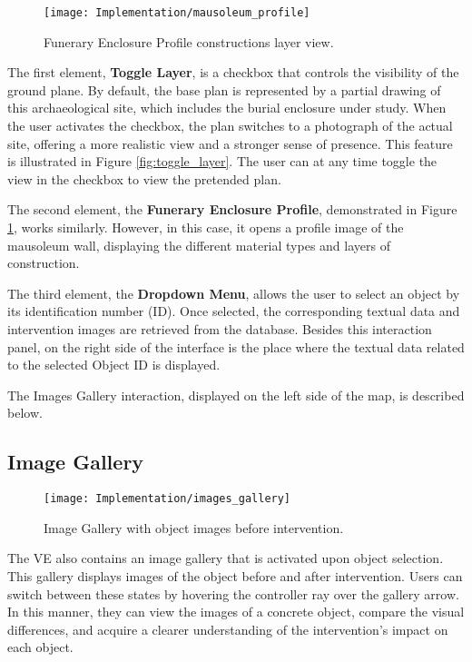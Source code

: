  \begin{figure}[h!]
    \centering
    \texttt{[image: Implementation/mausoleum\_profile]}
    \caption{Funerary Enclosure Profile constructions layer view.}
    \label{fig:mausoleum_profile}    
\end{figure}

The first element, \textbf{Toggle Layer}, is a checkbox that controls the visibility of the ground plane.
By default, the base plan is represented by a partial drawing of this archaeological site, which includes the burial enclosure under study. 
When the user activates the checkbox, the plan switches to a photograph of the actual site, offering a more realistic view and a stronger sense of presence. 
This feature is illustrated in Figure \ref{fig:toggle_layer}.
The user can at any time toggle the view in the checkbox to view the pretended plan.

The second element, the \textbf{Funerary Enclosure Profile}, demonstrated in Figure \ref{fig:mausoleum_profile}, works similarly. However, in this case, it opens a profile image of the mausoleum wall, displaying the different material types and layers of construction.

The third element, the \textbf{Dropdown Menu}, allows the user to select an object by its identification number (ID).
Once selected, the corresponding textual data and intervention images are retrieved from the database.
Besides this interaction panel, on the right side of the interface is the place where the textual data related to the selected Object ID is displayed.

The Images Gallery interaction, displayed on the left side of the map, is described below.

\subsection*{Image Gallery}
\label{sec:image_gallery}

\begin{figure}[h!]
    \centering
    \texttt{[image: Implementation/images\_gallery]}
    \caption{Image Gallery with object images before intervention.}
    \label{fig:image_gallery}
\end{figure}

The \gls{VE} also contains an image gallery that is activated upon object selection. 
This gallery displays images of the object before and after intervention. 
Users can switch between these states by hovering the controller ray over the gallery arrow. 
In this manner, they can view the images of a concrete object, compare the visual differences, and acquire a clearer understanding of the intervention's impact on each object.

